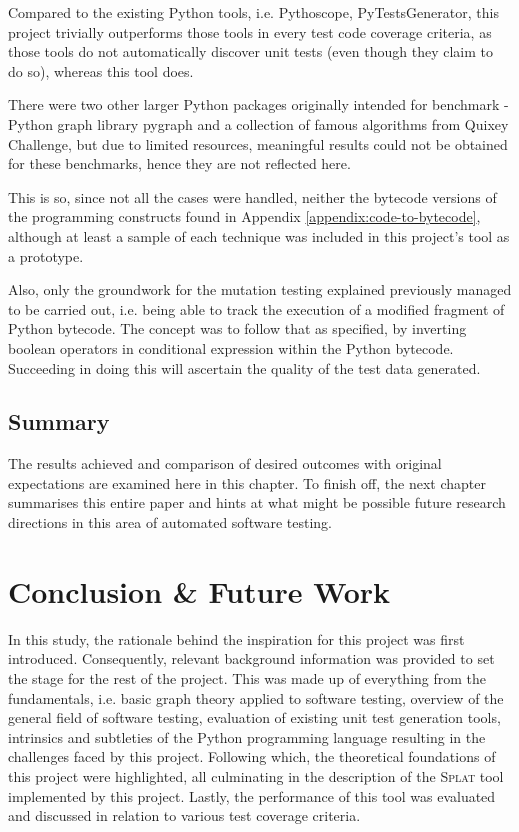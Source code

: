 \documentclass{icldt}
\numberwithin{equation}{section}       %
\newcommand{\blankpage}{
\newpage
\thispagestyle{empty}
\mbox{}
\newpage
}
\begin{document}
{{Compared to the existing Python tools, i.e. \textsf{Pythoscope}, \textsf{PyTestsGenerator}, this project trivially outperforms those tools in every test code coverage criteria, as those tools do not automatically discover unit tests (even though they claim to do so), whereas this tool does.

There were two other larger Python packages originally intended for benchmark - Python graph library \textsf{pygraph} and a collection of famous algorithms from Quixey Challenge, but due to limited resources, meaningful results could not be obtained for these benchmarks, hence they are not reflected here.

This is so, since not all the  cases were handled, neither the bytecode versions of the programming constructs found in Appendix \ref{appendix:code-to-bytecode}, although at least a sample of each technique was included in this project's tool as a prototype.

Also, only the groundwork for the mutation testing explained previously managed to be carried out, i.e. being able to track the execution of a modified fragment of Python bytecode. The concept was to follow that as specified, by inverting boolean operators in conditional expression within the Python bytecode. Succeeding in doing this will ascertain the quality of the test data generated.

\section{Summary}
The results achieved and comparison of desired outcomes with original expectations are examined here in this chapter. To finish off, the next chapter summarises this entire paper and hints at what might be possible future research directions in this area of automated software testing.
\chapter{Conclusion \& Future Work}
\label{ch:conclusion}

In this study, the rationale behind the inspiration for this project was first introduced. Consequently, relevant background information was provided to set the stage for the rest of the project. This was made up of everything from the fundamentals, i.e. basic graph theory applied to software testing, overview of the general field of software testing, evaluation of existing unit test generation tools, intrinsics and subtleties of the Python programming language resulting in the challenges faced by this project. Following which, the theoretical foundations of this project were highlighted, all culminating in the description of the \textsc{Splat} tool implemented by this project. Lastly, the performance of this tool was evaluated and discussed in relation to various test coverage criteria.

}}
\end{document}
